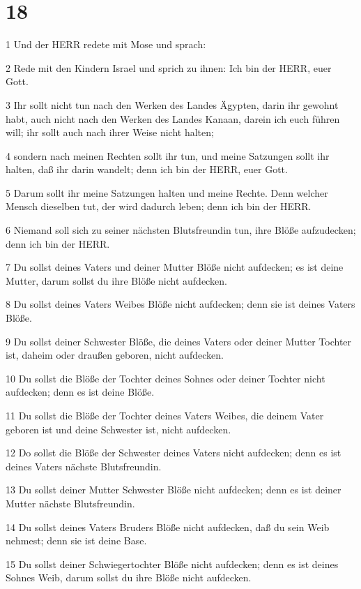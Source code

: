 \chapter{18}

\par 1 Und der HERR redete mit Mose und sprach:
\par 2 Rede mit den Kindern Israel und sprich zu ihnen: Ich bin der HERR, euer Gott.
\par 3 Ihr sollt nicht tun nach den Werken des Landes Ägypten, darin ihr gewohnt habt, auch nicht nach den Werken des Landes Kanaan, darein ich euch führen will; ihr sollt auch nach ihrer Weise nicht halten;
\par 4 sondern nach meinen Rechten sollt ihr tun, und meine Satzungen sollt ihr halten, daß ihr darin wandelt; denn ich bin der HERR, euer Gott.
\par 5 Darum sollt ihr meine Satzungen halten und meine Rechte. Denn welcher Mensch dieselben tut, der wird dadurch leben; denn ich bin der HERR.
\par 6 Niemand soll sich zu seiner nächsten Blutsfreundin tun, ihre Blöße aufzudecken; denn ich bin der HERR.
\par 7 Du sollst deines Vaters und deiner Mutter Blöße nicht aufdecken; es ist deine Mutter, darum sollst du ihre Blöße nicht aufdecken.
\par 8 Du sollst deines Vaters Weibes Blöße nicht aufdecken; denn sie ist deines Vaters Blöße.
\par 9 Du sollst deiner Schwester Blöße, die deines Vaters oder deiner Mutter Tochter ist, daheim oder draußen geboren, nicht aufdecken.
\par 10 Du sollst die Blöße der Tochter deines Sohnes oder deiner Tochter nicht aufdecken; denn es ist deine Blöße.
\par 11 Du sollst die Blöße der Tochter deines Vaters Weibes, die deinem Vater geboren ist und deine Schwester ist, nicht aufdecken.
\par 12 Do sollst die Blöße der Schwester deines Vaters nicht aufdecken; denn es ist deines Vaters nächste Blutsfreundin.
\par 13 Du sollst deiner Mutter Schwester Blöße nicht aufdecken; denn es ist deiner Mutter nächste Blutsfreundin.
\par 14 Du sollst deines Vaters Bruders Blöße nicht aufdecken, daß du sein Weib nehmest; denn sie ist deine Base.
\par 15 Du sollst deiner Schwiegertochter Blöße nicht aufdecken; denn es ist deines Sohnes Weib, darum sollst du ihre Blöße nicht aufdecken.
